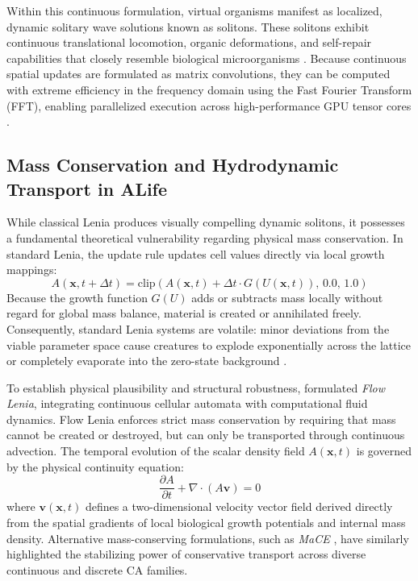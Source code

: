 Within this continuous formulation, virtual organisms manifest as localized, dynamic solitary wave solutions known as solitons. These solitons exhibit continuous translational locomotion, organic deformations, and self-repair capabilities that closely resemble biological microorganisms \parencite{chan2019lenia}. Because continuous spatial updates are formulated as matrix convolutions, they can be computed with extreme efficiency in the frequency domain using the Fast Fourier Transform (FFT), enabling parallelized execution across high-performance GPU tensor cores \parencite{chan2023towards}.

\subsection{Mass Conservation and Hydrodynamic Transport in ALife}
\label{subsec:bg_mass_conservation}

While classical Lenia produces visually compelling dynamic solitons, it possesses a fundamental theoretical vulnerability regarding physical mass conservation. In standard Lenia, the update rule updates cell values directly via local growth mappings:
\begin{equation}
A(\mathbf{x}, t + \Delta t) = \text{clip}\left(A(\mathbf{x}, t) + \Delta t \cdot G(U(\mathbf{x}, t)), \, 0.0, \, 1.0\right)
\label{eq:bg_standard_lenia}
\end{equation}
Because the growth function $G(U)$ adds or subtracts mass locally without regard for global mass balance, material is created or annihilated freely. Consequently, standard Lenia systems are volatile: minor deviations from the viable parameter space cause creatures to explode exponentially across the lattice or completely evaporate into the zero-state background \parencite{plantec2025flowlenia}.

To establish physical plausibility and structural robustness, \textcite{plantec2025flowlenia} formulated \textit{Flow Lenia}, integrating continuous cellular automata with computational fluid dynamics. Flow Lenia enforces strict mass conservation by requiring that mass cannot be created or destroyed, but can only be transported through continuous advection. The temporal evolution of the scalar density field $A(\mathbf{x}, t)$ is governed by the physical continuity equation:
\begin{equation}
\frac{\partial A}{\partial t} + \nabla \cdot (A \mathbf{v}) = 0
\label{eq:bg_continuity_law}
\end{equation}
where $\mathbf{v}(\mathbf{x}, t)$ defines a two-dimensional velocity vector field derived directly from the spatial gradients of local biological growth potentials and internal mass density. Alternative mass-conserving formulations, such as \textit{MaCE} \parencite{papadopoulos2025mace}, have similarly highlighted the stabilizing power of conservative transport across diverse continuous and discrete CA families.

